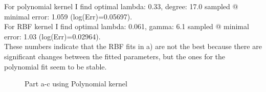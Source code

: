 \documentclass{article}
\newcommand{\1}{\mathbf{1}}
\begin{document}
\begin{enumerate}
    For polynomial kernel I find optimal lambda: 0.33, degree: 17.0 sampled @ minimal error: 1.059 (log(Err)=0.05697).\\
    For RBF kernel I find optimal lambda: 0.061, gamma: 6.1 sampled @ minimal error: 1.03 (log(Err)=0.02964). \\
    These numbers indicate that the RBF fits in a) are not the best because there are significant changes between the fitted parameters, but the ones for the polynomial fit seem to be stable. 
    \begin{figure}[h!]
    \centering 
        \caption{Part a-c using Polynomial kernel}
    \end{figure}
    \begin{figure}[h!]
    \centering 

\end{figure}
\end{enumerate}
\end{document}
